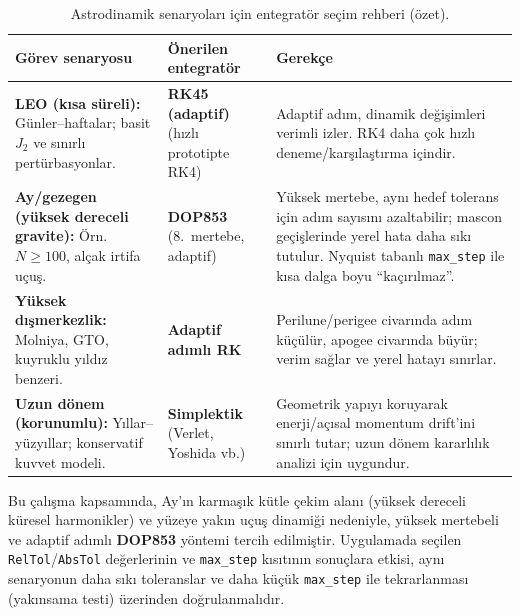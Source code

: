 \begin{table}[h]
\centering
\small
\renewcommand{\arraystretch}{1.15}
\begin{tabular}{|p{4cm}|p{4cm}|p{6cm}|}
\hline
\textbf{Görev senaryosu} & \textbf{Önerilen entegratör} & \textbf{Gerekçe} \\ \hline

\textbf{LEO (kısa süreli):} \newline Günler--haftalar; basit \(J_2\) ve sınırlı pertürbasyonlar. &
\textbf{RK45 (adaptif)} \newline (hızlı prototipte RK4) &
Adaptif adım, dinamik değişimleri verimli izler. RK4 daha çok hızlı deneme/karşılaştırma içindir. \\ \hline

\textbf{Ay/gezegen (yüksek dereceli gravite):} \newline Örn.\ \(N\ge 100\), alçak irtifa uçuş. &
\textbf{DOP853} \newline (8.\ mertebe, adaptif) &
Yüksek mertebe, aynı hedef tolerans için adım sayısını azaltabilir; mascon geçişlerinde yerel hata daha sıkı tutulur.
Nyquist tabanlı \texttt{max\_step} ile kısa dalga boyu “kaçırılmaz”. \\ \hline

\textbf{Yüksek dışmerkezlik:} \newline Molniya, GTO, kuyruklu yıldız benzeri. &
\textbf{Adaptif adımlı RK} &
Perilune/perigee civarında adım küçülür, apogee civarında büyür; verim sağlar ve yerel hatayı sınırlar. \\ \hline

\textbf{Uzun dönem (korunumlu):} \newline Yıllar--yüzyıllar; konservatif kuvvet modeli. &
\textbf{Simplektik} \newline (Verlet, Yoshida vb.) &
Geometrik yapıyı koruyarak enerji/açısal momentum drift’ini sınırlı tutar; uzun dönem kararlılık analizi için uygundur. \\ \hline

\end{tabular}
\caption{Astrodinamik senaryoları için entegratör seçim rehberi (özet).}
\label{tab:integrator_selection}
\end{table}

Bu çalışma kapsamında, Ay’ın karmaşık kütle çekim alanı (yüksek dereceli küresel harmonikler) ve yüzeye yakın uçuş dinamiği
nedeniyle, yüksek mertebeli ve adaptif adımlı \textbf{DOP853} yöntemi tercih edilmiştir. Uygulamada seçilen
\texttt{RelTol}/\texttt{AbsTol} değerlerinin ve \texttt{max\_step} kısıtının sonuçlara etkisi, aynı senaryonun daha sıkı toleranslar
ve daha küçük \texttt{max\_step} ile tekrarlanması (yakınsama testi) üzerinden doğrulanmalıdır.



